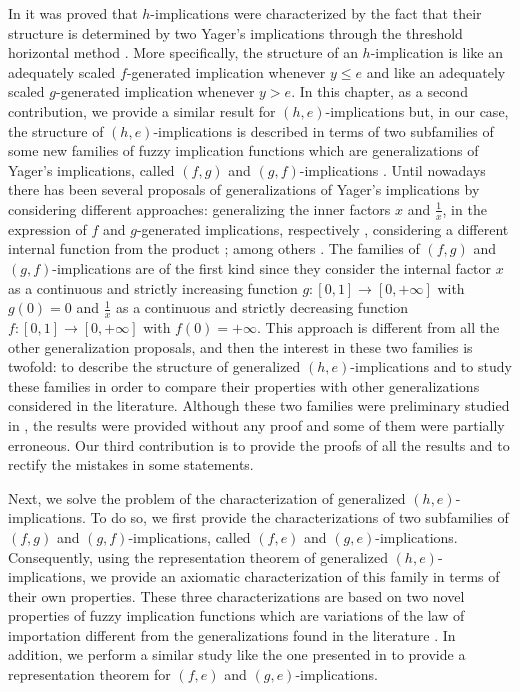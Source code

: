 In \cite{Massanet2012A} it was proved that $h$-implications were characterized by the fact that their structure is determined by two Yager's implications through the threshold horizontal method \cite{Massanet2012A}. More specifically, the structure of an $h$-implication is like an adequately scaled $f$-generated implication whenever $y \leq e$ and like an adequately scaled $g$-generated implication whenever $y>e$. In this chapter, as a second contribution, we provide a similar result for $(h,e)$-implications but, in our case,  the structure of $(h,e)$-implications is described in terms of two subfamilies of some new families of fuzzy implication functions which are generalizations of Yager's implications, called $(f,g)$ and $(g,f)$-implications \cite{Massanet2013B}. Until nowadays there has been several proposals of generalizations of Yager's implications by considering different approaches: generalizing the inner factors $x$ and  $\frac{1}{x}$, in the expression of $f$ and $g$-generated implications, respectively \cite{Massanet2013B,VemuriJayaram2012,XieLiu2013,PeiZhu2017}, considering a different internal function from the product \cite{Hlinena2012,Massanet2012C,ZhangLiu2013}; among others \cite{Liu2012,ZhangZhang2017}. The families of $(f,g)$ and $(g,f)$-implications are of the first kind since they consider the internal factor $x$ as a continuous and strictly increasing function $g:[0,1] \to [0,+\infty]$ with $g(0)=0$ and $\frac{1}{x}$ as a continuous and strictly decreasing function $f:[0,1] \to [0,+\infty]$ with $f(0)=+\infty$. This approach is different from all the other generalization proposals, and then the interest in these two families is twofold: to describe the structure of generalized $(h,e)$-implications and to study these families in order to compare their properties with other generalizations considered in the literature. Although these two families were preliminary studied in \cite{Massanet2013B}, the results were provided without any proof and some of them were partially erroneous. Our third contribution is to provide the proofs of all the results and to rectify the mistakes in some statements.

Next, we solve the problem of the characterization of generalized $(h,e)$-implications. To do so, we first provide the characterizations of two subfamilies of $(f,g)$ and $(g,f)$-implications, called $(f,e)$ and $(g,e)$-implications. Consequently, using the representation theorem of generalized $(h,e)$-implications, we provide an axiomatic characterization of this family in terms of their own properties. These three characterizations are based on two novel properties of fuzzy implication functions which are variations of the law of importation different from the generalizations found in the literature \cite{Baczynski2020,Massanet2011B}. In addition, we perform a similar study like the one presented in \cite{Vemuri2014} to provide a representation theorem for $(f,e)$ and $(g,e)$-implications. 

